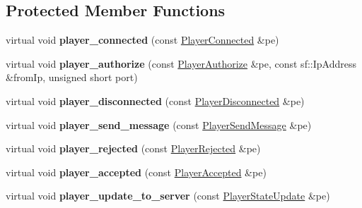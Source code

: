 \subsection*{Protected Member Functions}
\begin{DoxyCompactItemize}
\item 
\hypertarget{class_command_handler_a1d0c2dc14bcc75cec3dd71724fbe4d18}{virtual void {\bfseries player\-\_\-connected} (const \hyperlink{class_player_connected}{Player\-Connected} \&pe)}\label{class_command_handler_a1d0c2dc14bcc75cec3dd71724fbe4d18}

\item 
\hypertarget{class_command_handler_a35987e69fa0f51be0bbb8e936a692943}{virtual void {\bfseries player\-\_\-authorize} (const \hyperlink{class_player_authorize}{Player\-Authorize} \&pe, const sf\-::\-Ip\-Address \&from\-Ip, unsigned short port)}\label{class_command_handler_a35987e69fa0f51be0bbb8e936a692943}

\item 
\hypertarget{class_command_handler_afc70cb365362c2cddb669adf2dbed202}{virtual void {\bfseries player\-\_\-disconnected} (const \hyperlink{class_player_disconnected}{Player\-Disconnected} \&pe)}\label{class_command_handler_afc70cb365362c2cddb669adf2dbed202}

\item 
\hypertarget{class_command_handler_a6b43e54d3fad2cb9f0313c3a7e46fc31}{virtual void {\bfseries player\-\_\-send\-\_\-message} (const \hyperlink{class_player_send_message}{Player\-Send\-Message} \&pe)}\label{class_command_handler_a6b43e54d3fad2cb9f0313c3a7e46fc31}

\item 
\hypertarget{class_command_handler_a613f3b7fefc54f7d6d3438c8220a184e}{virtual void {\bfseries player\-\_\-rejected} (const \hyperlink{class_player_rejected}{Player\-Rejected} \&pe)}\label{class_command_handler_a613f3b7fefc54f7d6d3438c8220a184e}

\item 
\hypertarget{class_command_handler_ace85a13e7d35f3895894610cb665defc}{virtual void {\bfseries player\-\_\-accepted} (const \hyperlink{class_player_accepted}{Player\-Accepted} \&pe)}\label{class_command_handler_ace85a13e7d35f3895894610cb665defc}

\item 
\hypertarget{class_command_handler_ab64f0deae690c4cdfb0f89e7f8e435ee}{virtual void {\bfseries player\-\_\-update\-\_\-to\-\_\-server} (const \hyperlink{class_player_state_update}{Player\-State\-Update} \&pe)}\label{class_command_handler_ab64f0deae690c4cdfb0f89e7f8e435ee}


\end{DoxyCompactItemize}
